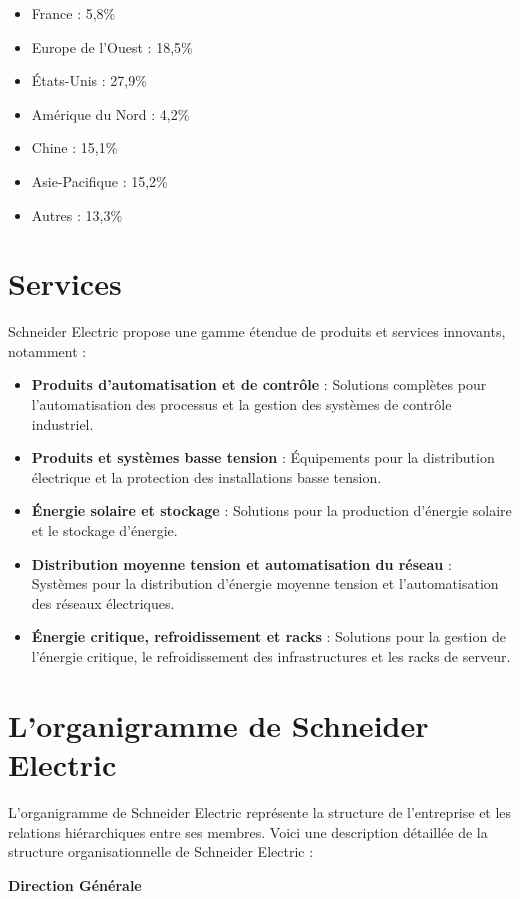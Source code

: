\begin{itemize}
  \item France : 5,8\%
  \item Europe de l'Ouest : 18,5\%
  \item États-Unis : 27,9\%
  \item Amérique du Nord : 4,2\%
  \item Chine : 15,1\%
  \item Asie-Pacifique : 15,2\%
  \item Autres : 13,3\%
\end{itemize}

\section{Services}

Schneider Electric propose une gamme étendue de produits et services innovants,
notamment :
\begin{itemize}
  \item \textbf{Produits d'automatisation et de contrôle} : Solutions complètes pour l'automatisation des processus et la gestion des systèmes de contrôle industriel.
  \item \textbf{Produits et systèmes basse tension} : Équipements pour la distribution électrique et la protection des installations basse tension.
  \item \textbf{Énergie solaire et stockage} : Solutions pour la production d'énergie solaire et le stockage d'énergie.
  \item \textbf{Distribution moyenne tension et automatisation du réseau} : Systèmes pour la distribution d'énergie moyenne tension et l'automatisation des réseaux électriques.
  \item \textbf{Énergie critique, refroidissement et racks} : Solutions pour la gestion de l'énergie critique, le refroidissement des infrastructures et les racks de serveur.
\end{itemize}

\section{L’organigramme de Schneider Electric}

L'organigramme de Schneider Electric représente la structure de l’entreprise et
les relations hiérarchiques entre ses membres. Voici une description détaillée
de la structure organisationnelle de Schneider Electric :

\textbf{Direction Générale}

